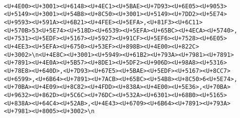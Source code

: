 \documentclass[
]{article}
\begin{document}
\begin{verbatim}
                                                                                                                                                                                                                                                                                                                                                                                                                                                                                                                                                                                        <U+4E00><U+3001><U+6148><U+4EC1><U+5BAE><U+7D93><U+6E05><U+9053><U+5149><U+3001><U+54B8><U+8C50><U+3001><U+5149><U+7DD2><U+5E74><U+9593><U+591A><U+6B21><U+4FEE><U+5EFA>,<U+81F3><U+6C11><U+570B>53<U+5E74><U+518D><U+6539><U+5EFA><U+65BC><U+4ECA><U+5740>,<U+7531><U+5EDF><U+5167><U+5927><U+91CF><U+5EF6><U+7528><U+6E05><U+4EE3><U+5EFA><U+6750><U+53EF><U+898B><U+4E00><U+822C><U+3002>\n<U+4E8C><U+3001><U+5949><U+61B2><U+793A><U+7981><U+7891><U+7891><U+4E0A><U+5B57><U+8DE1><U+5DF2><U+906D><U+98A8><U+5316><U+78E8><U+640D>,<U+7D93><U+67E5><U+5BAE><U+5EDF><U+5167><U+8CC7><U+6599>,<U+6B64><U+7891><U+7ACB><U+65BC><U+54B8><U+8C50>6<U+5E74>,<U+70BA><U+4E09><U+8C82><U+4FDD><U+838A><U+4E00><U+5E36>,<U+70BA><U+9632><U+862D><U+5C6C><U+76DC><U+532A><U+6301><U+68B0><U+5165><U+838A><U+64C4><U+52AB>,<U+4E43><U+6709><U+6B64><U+7891><U+793A><U+7981><U+8005><U+3002>\n

\end{verbatim}
\end{document}
